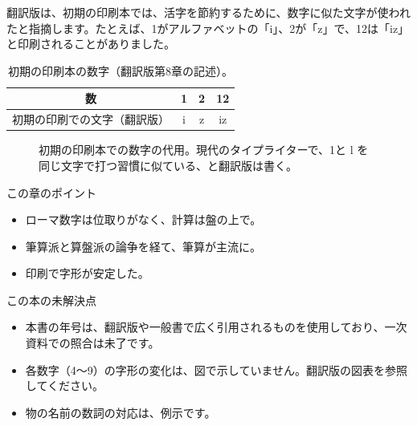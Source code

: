 \documentclass[a4paper,11pt,openany]{ltjsbook}
\begin{document}
翻訳版は、初期の印刷本では、活字を節約するために、数字に似た文字が使われたと指摘します。たとえば、1がアルファベットの「i」、2が「z」で、12は「iz」と印刷されることがありました。

\begin{table}[htbp]
\centering
\begin{tabular}{c|ccc}
\toprule
数 & 1 & 2 & 12\\
\midrule
初期の印刷での文字（翻訳版） & i & z & iz\\
\bottomrule
\end{tabular}
\caption{初期の印刷本の数字（翻訳版第8章の記述）。}
\end{table}

\begin{figure}[htbp]
\centering
{}
\caption{初期の印刷本での数字の代用。現代のタイプライターで、1と l を同じ文字で打つ習慣に似ている、と翻訳版は書く。}
\end{figure}

\begin{pointbox}{この章のポイント}
\begin{itemize}[leftmargin=1.5em]
\item ローマ数字は位取りがなく、計算は盤の上で。
\item 筆算派と算盤派の論争を経て、筆算が主流に。
\item 印刷で字形が安定した。
\end{itemize}
\end{pointbox}

\begin{notebox}{この本の未解決点}
\begin{itemize}[leftmargin=1.5em]
\item 本書の年号は、翻訳版や一般書で広く引用されるものを使用しており、一次資料での照合は未了です。
\item 各数字（4〜9）の字形の変化は、図で示していません。翻訳版の図表を参照してください。
\item 物の名前の数詞の対応は、例示です。
\end{itemize}
\end{notebox}
\end{document}
